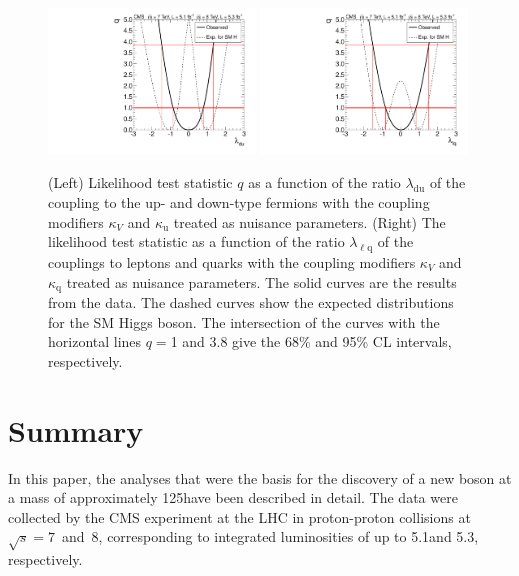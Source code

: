 \documentclass[11pt,twoside,a4paper,cmspaper,final,collab]{cms-tdr}
\begin{document}
\begin{figure}[bhtp]
\centering
\includegraphics[width=0.49\textwidth]{figures/comb/sqr_ldu_scan_1d_all} \hfill
\includegraphics[width=0.49\textwidth]{figures/comb/sqr_llq_scan_1d_all}
\caption{
(Left)  Likelihood test statistic $q$ as a function of
the ratio $\lambda_{\mathrm{du}}$ of the coupling to the up- and down-type fermions
with the coupling modifiers $\kappa_V$ and $\kappa_{\mathrm{u}}$
treated as nuisance parameters.
(Right) The likelihood test statistic as a function of
the ratio $\lambda_{\ell \mathrm{q}}$ of the couplings to leptons and quarks
with the coupling modifiers $\kappa_V$ and $\kappa_{\mathrm{q}}$
treated as nuisance parameters. The solid curves are the results from the
data. The dashed curves show the expected distributions for the SM Higgs boson. The intersection
of the curves with the horizontal lines $q=$1 and 3.8 give the 68\% and 95\% CL intervals, respectively.
}
\label{fig:fit_ldu_llq_scan}
\end{figure}








\section{Summary}\label{sec:Conclusion}

In this paper, the analyses that were the basis for the discovery of a new
boson at a mass of approximately 125\GeV have been described in detail.
The data were collected by the CMS experiment
at the LHC in proton-proton collisions at $\sqrt{s}=7$~and~8\TeV, corresponding
to integrated luminosities of up to 5.1\fbinv and 5.3\fbinv, respectively.
\end{document}
